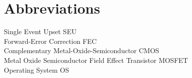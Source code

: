 
\section*{Abbreviations}
\large 
Single Event Upset \hfill SEU \\
Forward-Error Correction \hfill FEC \\
Complementary Metal-Oxide-Semiconductor \hfill CMOS \\
Metal Oxide Semiconductor Field Effect Transistor \hfill MOSFET \\
Operating System \hfill OS